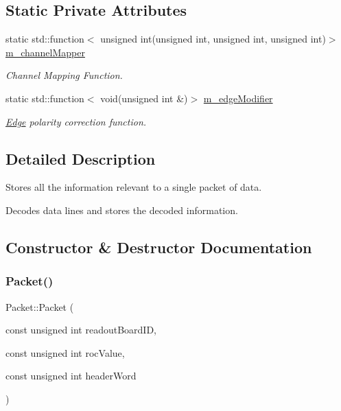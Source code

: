 \subsection*{Static Private Attributes}
\begin{DoxyCompactItemize}
\item 
static std\+::function$<$ unsigned int(unsigned int, unsigned int, unsigned int)$>$ \hyperlink{class_packet_a27f9a040a63e06e20a2097133a588997}{m\+\_\+channel\+Mapper}
\begin{DoxyCompactList}\small\item\em Channel Mapping Function. \end{DoxyCompactList}\item 
static std\+::function$<$ void(unsigned int \&)$>$ \hyperlink{class_packet_aa95ed5326667f67a5c2d101cd5a4afca}{m\+\_\+edge\+Modifier}
\begin{DoxyCompactList}\small\item\em \hyperlink{class_edge}{Edge} polarity correction function. \end{DoxyCompactList}\end{DoxyCompactItemize}


\subsection{Detailed Description}
Stores all the information relevant to a single packet of data. 

Decodes data lines and stores the decoded information. 

\subsection{Constructor \& Destructor Documentation}
\mbox{\label{class_packet_ac78ad72c2d0333e03dfdd5460fd6e816}} 
\subsubsection{\texorpdfstring{Packet()}{Packet()}}
{\footnotesize\ttfamily Packet\+::\+Packet (\begin{DoxyParamCaption}\item[{const unsigned int}]{readout\+Board\+ID,  }\item[{const unsigned int}]{roc\+Value,  }\item[{const unsigned int}]{header\+Word }\end{DoxyParamCaption})}



